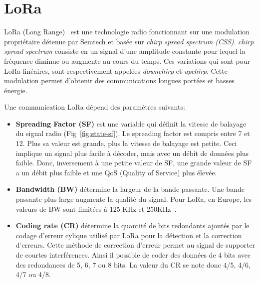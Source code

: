 \section{LoRa}\label{sec:etat_art-lora}
\renewcommand{\rightmark}{LoRa}

LoRa (Long Range)~\cite{sx1276:datasheet}\cite{paper:lora-reverse-engineering} est une technologie 
radio  fonctionnant sur une modulation propriétaire détenue par Semtech et basée sur \textit{chirp 
spread spectrum (CSS)}. \textit{chirp spread spectrum} consiste en un signal d'une amplitude 
constante pour lequel la fréquence diminue ou augmente au cours du temps. Ces variations qui sont 
pour LoRa linéaires, sont respectivement appelées \textit{downchirp} et \textit{upchirp}. Cette 
modulation permet d'obtenir des communications longues portées et basses énergie.

Une communication LoRa dépend des paramètres suivants:
\begin{itemize}
    \item \textbf{Spreading Factor (SF)} est une variable qui définit la vitesse de balayage du signal radio
    (Fig~\ref{fig:state-sf}). Le spreading factor est compris entre 7 et 12. Plus sa valeur est grande, plus la vitesse de balayage est petite. Ceci implique un signal plus facile à décoder, mais avec un débit de données plus faible. Donc, inversement à une petite valeur de SF, une grande valeur de SF a un débit plus faible et une QoS (Quality of Service) plus élevée.
    
    \item \textbf{Bandwidth (BW)} détermine la largeur de la bande passante. Une bande passante plus large augmente la qualité du signal. Pour LoRa, en Europe, les valeurs de BW sont limitées à 125 KHz et 250KHz~\cite{lora-frequencyplan}.
    
    \item \textbf{Coding rate (CR)} détermine la quantité de bits redondants ajoutés par le codage d'erreur cylique utilisé par LoRa pour la détection et la correction d'erreurs. Cette méthode de correction d'erreur permet au signal de supporter de courtes interférences. Ainsi il possible de coder des données de 4 bits avec des redondances de 5, 6, 7 ou 8 bits. La valeur du CR se note donc 4/5, 4/6, 4/7 ou 4/8.
    
\end{itemize}


